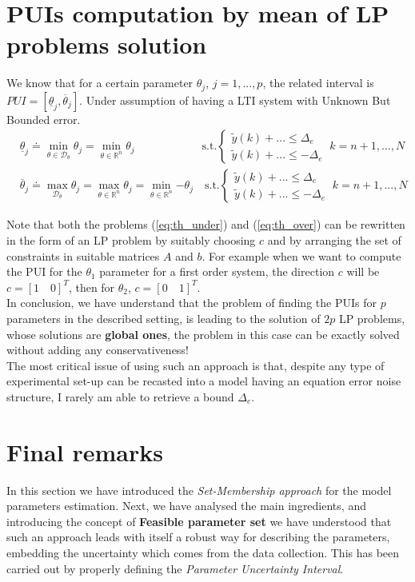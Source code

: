 \section{PUIs computation by mean of LP problems solution} 
We know that for a certain parameter $\theta_j$, $j=1,...,p$,  the related interval is $PUI=[\underline{\theta}_j, \overline{\theta}_j]$. Under assumption of having a LTI system with Unknown But Bounded error.
\begin{align}
    \label{eq:th_under}
    &\underline{\theta}_j \doteq \min_{\theta\in\mathcal{D}_\theta} \theta_j= \min_{\theta\in\mathbb{R}^n} \theta_j 
    \qquad \qquad \qquad  \text{s.t.} \begin{cases}
        \tilde{y}(k)+... \le \Delta_e\\
        \tilde{y}(k)+... \le -\Delta_e
    \end{cases} \ k=n+1, ..., N\\
    \label{eq:th_over}
    &\overline{\theta}_j \doteq \max_{\mathcal{D}_\theta} {\theta_j} = \max_{\theta\in\mathbb{R}^n} {\theta_j}=\min_{\theta\in\mathbb{R}^n} {-\theta_j} 
    \quad  \text{s.t.} \begin{cases}
        \tilde{y}(k)+... \le \Delta_e\\
        \tilde{y}(k)+... \le -\Delta_e
    \end{cases} \ k=n+1, ..., N
\end{align}

\noindent
Note that both the problems (\ref{eq:th_under}) and (\ref{eq:th_over}) can be rewritten in the form of an LP problem by suitably choosing $c$ and by arranging the set of constraints in suitable matrices $A$ and $b$. For example when we want to compute the PUI for the $\theta_1$ parameter for a first order system, the direction $c$ will be $c=[1 \quad 0]^T$, then for $\theta_2$, $c=[0 \quad 1]^T$.\\
In conclusion, we have understand that the problem of finding the PUIs for $p$ parameters in the described setting, is leading to the solution of $2p$ LP problems, whose solutions are \textbf{global ones}, the problem in this case can be exactly solved without adding any conservativeness!\\

\noindent
The most critical issue of using such an approach is that, despite any type of experimental set-up can be recasted into a model having an equation error noise structure, I rarely am able to retrieve a bound $\Delta_e$. 

\section{Final remarks}
In this section we have introduced the \textit{Set-Membership approach} for the model parameters estimation. Next, we have analysed the main ingredients, and introducing the concept of \textbf{Feasible parameter set} we have understood that such an approach leads with itself a robust way for describing the parameters, embedding the uncertainty which comes from the data collection. This has been carried out by properly defining the \textit{Parameter Uncertainty Interval}. \\

